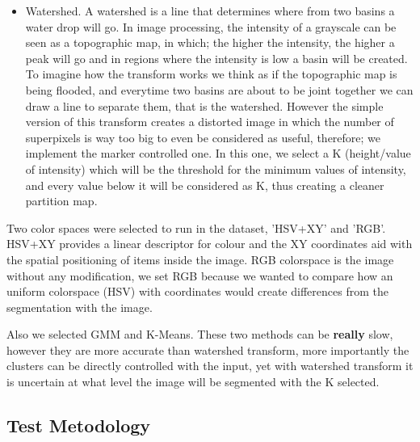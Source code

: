 \documentclass[10pt,twocolumn,letterpaper]{article}
\begin{document}
\begin{itemize}
     \item Watershed. 
     A watershed is a line that determines where from two basins a water drop will go. In image processing, the intensity of a grayscale can be seen as a topographic map, in which; the higher the intensity, the higher a peak will go and in regions where the intensity is low a basin will be created. To imagine how the transform works we think as if the topographic map is being flooded, and everytime two basins are about to be joint together we can draw a line to separate them, that is the watershed.\cite{meyer_1994}
     However the simple version of this transform creates a distorted image in which the number of superpixels is way too big to even be considered as useful, therefore; we implement the marker controlled one. In this one, we select a K (height/value of intensity) which will be the threshold for the minimum values of intensity, and every value below it will be considered as K, thus creating a cleaner partition map.
\end{itemize}

Two color spaces were selected to run in the dataset, 'HSV+XY' and 'RGB'. HSV+XY provides a linear descriptor for colour and the XY coordinates aid with the spatial positioning of items inside the image. RGB colorspace is the image without any modification, we set RGB because we wanted to compare how an uniform colorspace (HSV) with coordinates would create differences from the segmentation with the image.

Also we selected GMM and K-Means. These two methods can be \textbf{really} slow, however they are more accurate than watershed transform, more importantly the clusters can be directly controlled with the input, yet with watershed transform it is uncertain at what level the image will be segmented with the K selected.

\subsection{Test Metodology}
\end{document}
